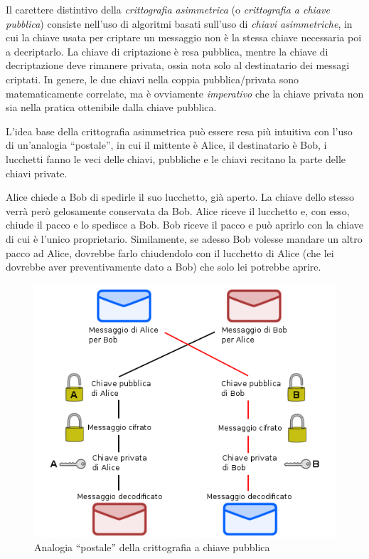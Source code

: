 \documentclass[pdflatex,11pt,a4paper,oneside]{article}
\begin{document}
Il carettere distintivo della \emph{crittografia asimmetrica} (o
\emph{crittografia a chiave pubblica}) consiste nell'uso di algoritmi
basati sull'uso di \emph{chiavi asimmetriche}, in cui la chiave usata
per criptare un messaggio non \`e la stessa chiave necessaria poi a
decriptarlo.  La chiave di criptazione \`e resa pubblica, mentre la chiave
di decriptazione deve rimanere privata, ossia nota solo al destinatario
dei messagi criptati. In genere, le due chiavi nella coppia
pubblica/privata sono matematicamente correlate, ma \`e ovviamente
\emph{imperativo} che la chiave privata non sia nella pratica ottenibile
dalla chiave pubblica.

\medskip
L'idea base della crittografia asimmetrica pu\`o essere resa pi\`u
intuitiva con l'uso di un'analogia ``postale'', in cui il mittente \`e
Alice, il destinatario \`e Bob, i lucchetti fanno le veci delle chiavi,
pubbliche e le chiavi recitano la parte delle chiavi private.

Alice chiede a Bob di spedirle il suo lucchetto, gi\`a aperto. La chiave
dello stesso verr\`a per\`o gelosamente conservata da Bob. Alice riceve
il lucchetto e, con esso, chiude il pacco e lo spedisce a Bob. Bob riceve
il pacco e pu\`o aprirlo con la chiave di cui \`e l'unico proprietario.
Similamente, se adesso Bob volesse mandare un altro pacco ad Alice,
dovrebbe farlo chiudendolo con il lucchetto di Alice (che lei dovrebbe
aver preventivamente dato a Bob) che solo lei potrebbe aprire.

\begin{figure}[!h]
  \centering
    \includegraphics[scale=0.5]{pubkey-postal-analogy}
    \caption{Analogia ``postale'' della crittografia a chiave pubblica}
    \label{fig:pubkey-postal-analogy}
\end{figure}
\end{document}
